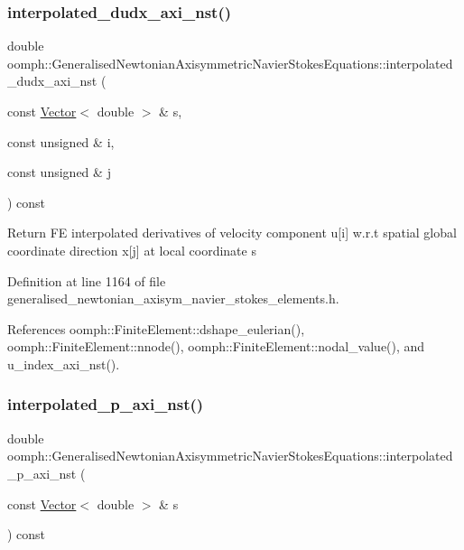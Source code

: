 \subsubsection{\texorpdfstring{interpolated\+\_\+dudx\+\_\+axi\+\_\+nst()}{interpolated\_dudx\_axi\_nst()}}
{\footnotesize\ttfamily double oomph\+::\+Generalised\+Newtonian\+Axisymmetric\+Navier\+Stokes\+Equations\+::interpolated\+\_\+dudx\+\_\+axi\+\_\+nst (\begin{DoxyParamCaption}\item[{const \hyperlink{classoomph_1_1Vector}{Vector}$<$ double $>$ \&}]{s,  }\item[{const unsigned \&}]{i,  }\item[{const unsigned \&}]{j }\end{DoxyParamCaption}) const\hspace{0.3cm}{\ttfamily [inline]}}

Return FE interpolated derivatives of velocity component u\mbox{[}i\mbox{]} w.\+r.\+t spatial global coordinate direction x\mbox{[}j\mbox{]} at local coordinate s 

Definition at line 1164 of file generalised\+\_\+newtonian\+\_\+axisym\+\_\+navier\+\_\+stokes\+\_\+elements.\+h.



References oomph\+::\+Finite\+Element\+::dshape\+\_\+eulerian(), oomph\+::\+Finite\+Element\+::nnode(), oomph\+::\+Finite\+Element\+::nodal\+\_\+value(), and u\+\_\+index\+\_\+axi\+\_\+nst().

\mbox{\label{classoomph_1_1GeneralisedNewtonianAxisymmetricNavierStokesEquations_aca81008fa3d8a4b7d8c9c95300087dd2}} 
\subsubsection{\texorpdfstring{interpolated\+\_\+p\+\_\+axi\+\_\+nst()}{interpolated\_p\_axi\_nst()}}
{\footnotesize\ttfamily double oomph\+::\+Generalised\+Newtonian\+Axisymmetric\+Navier\+Stokes\+Equations\+::interpolated\+\_\+p\+\_\+axi\+\_\+nst (\begin{DoxyParamCaption}\item[{const \hyperlink{classoomph_1_1Vector}{Vector}$<$ double $>$ \&}]{s }\end{DoxyParamCaption}) const\hspace{0.3cm}{\ttfamily [inline]}}




